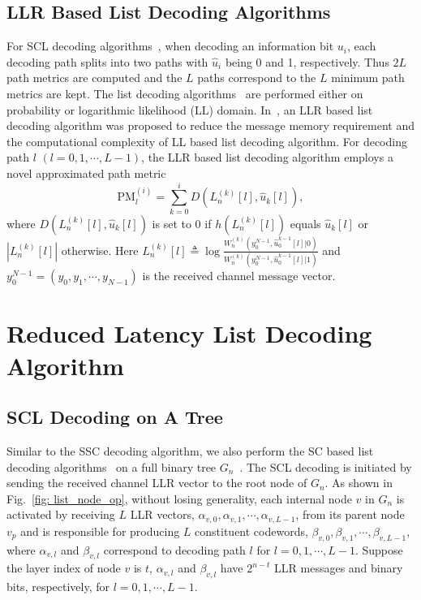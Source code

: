 \documentclass[journal]{IEEEtran}
\begin{document}
\subsection{LLR Based List Decoding Algorithms} \label{ssec: llr_based}
For SCL decoding algorithms~\cite{ido_it, tree_list_dec, llr_list}, when decoding an information bit $u_i$, each decoding path splits into two paths with $\hat{u}_i$ being 0 and 1, respectively. Thus $2L$ path metrics are computed and the $L$ paths correspond to the $L$ minimum path metrics are kept.
The list decoding algorithms~\cite{ido_it, tree_list_dec} are performed either on probability or logarithmic likelihood (LL) domain. In~\cite{llr_list}, an LLR based list decoding algorithm was proposed to reduce the message memory requirement and the computational complexity of LL based list decoding algorithm. For decoding path $l$ $(l=0,1,\cdots,L-1)$, the LLR based list decoding algorithm employs a novel approximated path metric
\begin{equation}\label{equ: path_metric}
\mbox{PM}_l^{(i)} = \sum_{k=0}^{i}D(L_n^{(k)}[l],\hat{u}_k[l]),
\end{equation}
where $D(L_n^{(k)}[l],\hat{u}_k[l])$ is set to 0 if $h(L_n^{(k)}[l])$ equals $\hat{u}_k[l]$ or $|L_n^{(k)}[l]|$ otherwise. Here $L_n^{(k)}[l] \triangleq \log\frac{W_n^{(k)}(y_0^{N-1},\hat{u}_0^{k-1}[l]|0)}{W_n^{(k)}(y_0^{N-1},\hat{u}_0^{k-1}[l]|1)}$ and $y_0^{N-1}=(y_0,y_1,\cdots,y_{N-1})$ is the received channel message vector.
\section{Reduced Latency List Decoding Algorithm}
\label{sec: rlld}

\subsection{SCL Decoding on A Tree}\label{ssec:node_activation}
Similar to the SSC decoding algorithm, we also perform the SC based list decoding algorithms~\cite{ido_it, tree_list_dec} on a full binary tree $G_n$~\cite{jun_sips, gabi_low_latency}. The SCL decoding is initiated by sending the received channel LLR vector to the root node of $G_n$. As shown in Fig.~\ref{fig: list_node_op}, without losing generality, each internal node $v$ in $G_n$ is activated by receiving $L$ LLR vectors, $\alpha_{v,0}, \alpha_{v,1}, \cdots, \alpha_{v,L-1}$, from its parent node $v_p$ and is responsible for producing $L$ constituent codewords, $\beta_{v,0}, \beta_{v,1}, \cdots, \beta_{v,L-1}$, where $\alpha_{v,l}$ and $\beta_{v,l}$ correspond to decoding path $l$ for $l=0,1,\cdots,L-1$. Suppose the layer index of node $v$ is $t$, $\alpha_{v,l}$ and $\beta_{v,l}$ have $2^{n-t}$ LLR messages and binary bits, respectively, for $l=0,1,\cdots,L-1$.
\end{document}
